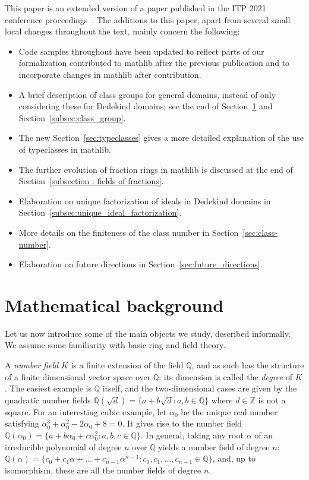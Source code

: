 \documentclass[sn-mathphys]{sn-jnl}%
\newcommand{\mathlib}{\textsf{mathlib}\xspace}
\newcommand{\QQ}{\mathbb{Q}}
\renewcommand{\Z}{\mathbb{Z}}
\begin{document}
This paper is an extended version of a paper published in the ITP 2021 conference proceedings~\cite{ClassGroupsITP2021}. The additions to this paper, apart from several small local changes throughout the text, mainly concern the following:
\begin{itemize}
 \item Code samples throughout have been updated to reflect parts of our formalization contributed to \mathlib after the previous publication and to incorporate changes in \mathlib after contribution.
 \item A brief description of class groups for general domains, instead of only considering these for Dedekind domains; see the end of Section~\ref{sec math background} and Section~\ref{subsec:class_group}.
 \item The new Section~\ref{sec:typeclasses} gives a more detailed explanation of the use of typeclasses in \mathlib.
 \item The further evolution of fraction rings in \mathlib is discussed at the end of Section~\ref{subsection : fields of fractions}.
 \item Elaboration on unique factorization of ideals in Dedekind domains in Section~\ref{subsec:unique_ideal_factorization}.
 \item More details on the finiteness of the class number in Section~\ref{sec:class-number}.
 \item Elaboration on future directions in Section~\ref{sec:future_directions}.
\end{itemize}

\section{Mathematical background}\label{sec math background}

Let us now introduce some of the main objects we study, described informally. We assume some familiarity with basic ring and field theory.

A \emph{number field} $K$ is a finite extension of the field $\QQ$, and as such has the structure of a finite dimensional vector space over $\QQ$; its dimension is called the \emph{degree} of $K$.
The easiest example is $\QQ$ itself, and the two-dimensional cases are given by the quadratic number fields
$\QQ(\sqrt{d})=\{a+b\sqrt{d} : a,b \in \QQ\}$
where $d \in \Z$ is not a square.
For an interesting cubic example, let $\alpha_0$ be the unique real number satisfying $\alpha_0^3 + \alpha_0^2 - 2\alpha_0 + 8=0$.
It gives rise to the number field
$\QQ(\alpha_0)=\{a+b\alpha_0+c \alpha_0^2: a,b,c \in \QQ\}$.
In general, taking any root $\alpha$ of an irreducible polynomial of degree $n$ over $\QQ$ yields a number field of degree $n$:
$\QQ(\alpha)=\{c_0+c_1\alpha+\ldots+c_{n-1} \alpha^{n-1} : c_0,c_1,\ldots,c_{n-1} \in \QQ \}$,
and, up to isomorphism, these are all the number fields of degree $n$.
\end{document}
